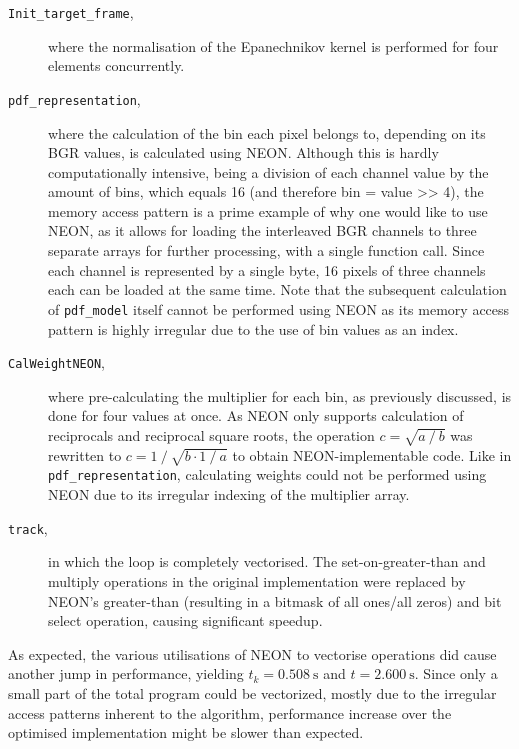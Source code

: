 \documentclass[final]{article}
\begin{document}
\begin{description}
    \item[\texttt{Init\_target\_frame},] where the normalisation of the Epanechnikov kernel is performed for four elements concurrently.

    \item[\texttt{pdf\_representation},] where the calculation of the bin each pixel belongs to, depending on its BGR values, is calculated using NEON.
    Although this is hardly computationally intensive, being a division of each channel value by the amount of bins, which equals 16 (and therefore bin = value >> 4), the memory access pattern is a prime example of why one would like to use NEON, as it allows for loading the interleaved BGR channels to three separate arrays for further processing, with a single function call.
    Since each channel is represented by a single byte, 16 pixels of three channels each can be loaded at the same time.
    Note that the subsequent calculation of \texttt{pdf\_model} itself cannot be performed using NEON as its memory access pattern is highly irregular due to the use of bin values as an index.

    \item[\texttt{CalWeightNEON},] where pre-calculating the multiplier for each bin, as previously discussed, is done for four values at once.
    As NEON only supports calculation of reciprocals and reciprocal square roots, the operation $c = \sqrt{a \mathbin{/} b}$ was rewritten to $c = 1 \mathbin{/} \sqrt{b \cdot 1 \mathbin{/} a}$ to obtain NEON-implementable code.
    Like in \texttt{pdf\_representation}, calculating weights could not be performed using NEON due to its irregular indexing of the multiplier array.

    \item[\texttt{track},] in which the loop is completely vectorised.
    The set-on-greater-than and multiply operations in the original implementation were replaced by NEON's greater-than (resulting in a bitmask of all ones/all zeros) and bit select operation, causing significant speedup.
\end{description}

As expected, the various utilisations of NEON to vectorise operations did cause another jump in performance, yielding $t_k = \SI{0.508}{\second}$ and $t = \SI{2.600}{\second}$. Since only a small part of the total program could be vectorized, mostly due to the irregular access patterns inherent to the algorithm, performance increase over the optimised implementation might be slower than expected.
\end{document}
